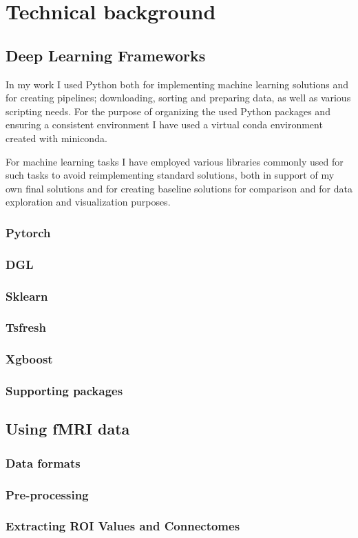 \chapter{Technical background}

\section{Deep Learning Frameworks}

	In my work I used Python both for implementing machine learning solutions and for creating pipelines; downloading, sorting and preparing data, as well as various scripting needs. For the purpose of organizing the used Python packages and ensuring a consistent environment I have used a virtual conda environment created with miniconda.
	
	For machine learning tasks I have employed various libraries commonly used for such tasks to avoid reimplementing standard solutions, both in support of my own final solutions and for creating baseline solutions for comparison and for data exploration and visualization purposes.

	\subsection{Pytorch}
	
	\subsection{DGL}
	
	\subsection{Sklearn}
	
	\subsection{Tsfresh}
	
	\subsection{Xgboost}
	
	\subsection{Supporting packages}

\section{Using fMRI data}

	\subsection{Data formats}
	
	\subsection{Pre-processing}
	
	\subsection{Extracting ROI Values and Connectomes}